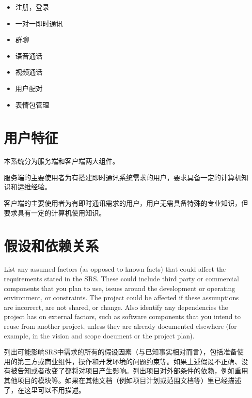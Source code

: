 


\begin{itemize}
	\item 注册，登录
	\item 一对一即时通讯
	\item 群聊
	\item 语音通话
	\item 视频通话
	\item 用户配对
	\item 表情包管理
	\end{itemize}

\section{用户特征}
%
%

本系统分为服务端和客户端两大组件。

服务端的主要使用者为有搭建即时通讯系统需求的用户，要求具备一定的计算机知识和运维经验。

客户端的主要使用者为有即时通讯需求的用户，用户无需具备特殊的专业知识，但要求具有一定的计算机使用知识。

\section{假设和依赖关系}
List any assumed factors (as opposed to known facts) that could affect the requirements stated in the SRS. These could include third party or commercial components that you plan to use, issues around the development or operating environment, or constraints. The project could be affected if these assumptions are incorrect, are not shared, or change. Also identify any dependencies the project has on external factors, such as software components that you intend to reuse from another project, unless they are already documented elsewhere (for example, in the vision and scope document or the project plan). 

列出可能影响SRS中需求的所有的假设因素（与已知事实相对而言），包括准备使用的第三方或商业组件，操作和开发环境的问题约束等。如果上述假设不正确、没有被告知或者改变了都将对项目产生影响。列出项目对外部条件的依赖，例如重用其他项目的模块等。如果在其他文档（例如项目计划或范围文档等）里已经描述了，在这里可以不用描述。
